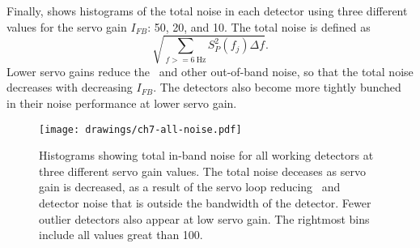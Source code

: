 Finally,  shows histograms of the total noise in each detector using three different values for the servo gain $I_{FB}$: 50, 20, and 10.
The total noise is defined as
\begin{equation} \label{eqn:ch7-tot-noise-defn}
  \sqrt{ \sum_{f >= \SI{6}{\hertz}} S^2_P(f_j) \Delta f}.
\end{equation}
Lower servo gains reduce the \SQUID\ and other out-of-band noise, so that the total noise decreases with decreasing $I_{FB}$.
The detectors also become more tightly bunched in their noise performance at lower servo gain.

\begin{figure*}
  \centering
\texttt{[image: drawings/ch7-all-noise.pdf]}
\caption[Total in-band noise]{
Histograms showing total in-band noise for all working detectors at three different servo gain values.
The total noise deceases as servo gain is decreased, as a result of the servo loop reducing \SQUID\ and detector noise that is outside the bandwidth of the detector.
Fewer outlier detectors also appear at low servo gain.
The rightmost bins include all values great than \SI{100}{\fW}.}
\label{fig:ch7-all-noise}
\end{figure*}
